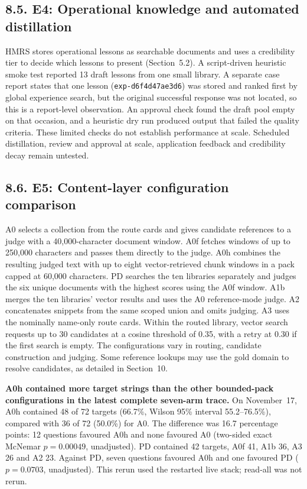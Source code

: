 \subsection{8.5. E4: Operational knowledge and automated distillation}

HMRS stores operational lessons as searchable documents and uses a
credibility tier to decide which lessons to present
(Section~5.2). A script-driven heuristic smoke test
reported 13 draft lessons from one small library. A separate case report
states that one lesson (\texttt{exp-d6f4d47ae3d6}) was stored and ranked
first by global experience search, but the original successful response
was not located, so this is a report-level observation. An approval check
found the draft pool empty on that occasion, and a heuristic dry run
produced output that failed the quality criteria. These limited checks do
not establish performance at scale. Scheduled distillation, review and
approval at scale, application feedback and credibility decay remain
untested.

\subsection{8.6. E5: Content-layer configuration comparison}

A0 selects a collection from the route cards and gives candidate references
to a judge with a 40{,}000-character document window. A0f fetches windows of
up to 250{,}000 characters and passes them directly to the judge. A0h
combines the resulting judged text with up to eight vector-retrieved chunk
windows in a pack capped at 60{,}000 characters. PD searches the ten libraries
separately and judges the six unique documents with the highest scores using
the A0f window. A1b merges the ten libraries' vector results and uses the A0
reference-mode judge. A2 concatenates snippets from the same scoped union
and omits judging. A3 uses the nominally name-only route cards. Within the
routed library, vector search requests up to 30 candidates at a cosine
threshold of 0.35, with a retry at 0.30 if the first search is empty.
The configurations vary in routing, candidate construction and judging.
Some reference lookups may use the gold domain to resolve candidates,
as detailed in Section~10.

\textbf{A0h contained more target strings than the other bounded-pack
configurations in the latest complete seven-arm trace.} On November~17,
A0h contained 48 of 72 targets (66.7\%, Wilson 95\% interval
55.2--76.5\%), compared with 36 of 72 (50.0\%) for A0. The difference
was 16.7 percentage points: 12 questions favoured A0h and none favoured
A0 (two-sided exact McNemar $p=0.00049$, unadjusted). PD contained 42
targets, A0f 41, A1b 36, A3 26 and A2 23. Against PD, seven questions favoured
A0h and one favoured PD ($p=0.0703$, unadjusted). This rerun used the
restarted live stack; read-all was not rerun.

